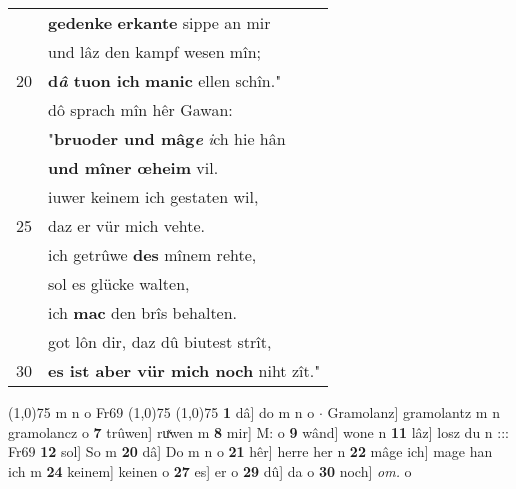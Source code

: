 \documentclass[8pt,a4paper,notitlepage]{article}
\begin{document}
\begin{table}[ht]
\begin{minipage}[t]{0.5\linewidth}
\begin{tabular}{rl}
 & \textbf{gedenke} \textbf{erkante} sippe an mir\\ 
 & und lâz den kampf wesen mîn;\\ 
20 & \textbf{d\textit{â} tuon ich} \textbf{manic} ellen schîn."\\ 
 & dô sprach mîn hêr Gawan:\\ 
 & "\textbf{bruoder und mâg\textit{e}} \textit{i}ch hie hân\\ 
 & \textbf{und mîner œheim} vil.\\ 
 & iuwer keinem ich gestaten wil,\\ 
25 & daz er vür mich vehte.\\ 
 & ich getrûwe \textbf{des} mînem rehte,\\ 
 & sol es glücke walten,\\ 
 & ich \textbf{mac} den brîs behalten.\\ 
 & got lôn dir, daz dû biutest strît,\\ 
30 & \textbf{es ist aber vür mich noch} niht zît."\\ 
\end{tabular}
\scriptsize
\line(1,0){75} \newline
m n o Fr69 \newline
\line(1,0){75} \newline
\newline
\line(1,0){75} \newline
\textbf{1} dâ] do m n o  $\cdot$ Gramolanz] gramolantz m n gramolancz o \textbf{7} trûwen] ruͯwen m \textbf{8} mir] M: o \textbf{9} wând] wone n \textbf{11} lâz] losz du n ::: Fr69 \textbf{12} sol] So m \textbf{20} dâ] Do m n o \textbf{21} hêr] herre her n \textbf{22} mâge ich] mage han ich m \textbf{24} keinem] keinen o \textbf{27} es] er o \textbf{29} dû] da o \textbf{30} noch] \textit{om.} o \newline
\end{minipage}
\end{table}
\newpage
\end{document}
